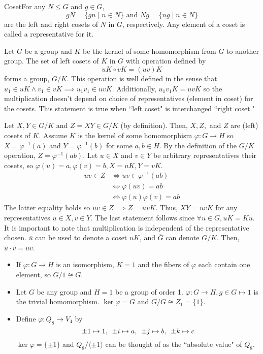 \documentclass{report}
\newcommand{\thm}[2]{\begin{Theorem}{#1}{}#2\end{Theorem}}
\newcommand{\ex}[2]{\begin{Example}{#1}{}#2\end{Example}}
\newcommand{\dfn}[2]{\begin{Definition}[colbacktitle=red!75!black]{#1}{}#2\end{Definition}}
\newenvironment{myproof}[1][\proofname]{%
	\proof[\bfseries #1: ]%
}{\endproof}
\begin{document}
\dfn{Coset}{For any $N \leq G$ and $g \in G$, 
$$gN = \{gn \mid n \in N \} \text{  and  } Ng = \{ ng \mid n \in N \}$$
are the left and right cosets of $N$ in $G$, respectively. Any element of a coset is called a representative for it.}
\thm{}{Let $G$ be a group and $K$ be the kernel of some homomorphism from $G$ to another group. The set of left cosets of $K$ in $G$ with operation defined by 
$$uK \circ vK = (uv)K$$
forms a group, $G/K$. This operation is well defined in the sense that $u_1 \in uK \land v_1 \in vK \implies u_1 v_1 \in uvK$. Additionally, $u_1 v_1 K = uvK$ so the multiplication doesn't depend on choice of representatives (element in coset) for the cosets. This statement is true when ``left coset" is interchanged ``right coset."}
\begin{myproof}
    Let $X,Y \in G/K$ and $Z = XY \in G/K$ (by definition). Then, $X,Z,$ and $Z$ are (left) cosets of $K$. Assume $K$ is the kernel of some homomorphism $\varphi : G \to H$ so $X = \varphi ^{-1} (a)$ and $Y = \varphi^{-1} (b)$ for some $a,b \in H$. By the definition of the $G/K$ operation, $Z = \varphi^{-1} (ab)$. Let $u \in X$ and $v \in Y$ be arbitrary representatives their cosets, so $\varphi (u) = a, \varphi(v) = b, X = uK, Y = vK$. 
    \begin{align*}
        uv \in Z &\iff uv \in \varphi^{-1} (ab)\\
        & \iff \varphi(uv) = ab\\
        & \iff \varphi(u)\varphi(v) = ab
    \end{align*}
    The latter equality holds so $uv \in Z \implies Z = uvK$. Thus, $XY = uvK$ for any representatives $u \in X, v \in Y$. The last statement follows since $\forall u \in G, uK=Ku$.
\end{myproof}
It is important to note that multiplication is independent of the representative chosen. $\overline{u}$  can be used to denote a coset $uK$, and $\overline{G}$ can denote $G/K$. Then, $\overline{u} \cdot \overline{v} = \overline{uv}$. 
\ex{}{\begin{itemize}
    \item If $\varphi : G \to H$ is an isomorphism, $K = 1$ and the fibers of $\varphi$ each contain one element, so $G/1 \cong G$.
    \item Let $G$ be any group and $H = 1$ be a group of order 1. $\varphi: G \to H, g \in G \mapsto 1$ is the trivial homomorphism. $\ker \varphi = G$ and $G/G \cong Z_1 = \{1\}.$
    \item Define $\varphi : Q_8 \to V_4$ by $$\pm 1 \mapsto 1,\hspace{5 pt} \pm i \mapsto a,\hspace{5 pt} \pm j \mapsto b, \hspace{5 pt} \pm k \mapsto c$$
    $\ker \varphi = \{\pm 1 \}$ and $Q_8 / \langle \pm 1 \rangle$ can be thought of as the ``absolute value" of $Q_8$. 
\end{itemize} }
\end{document}
